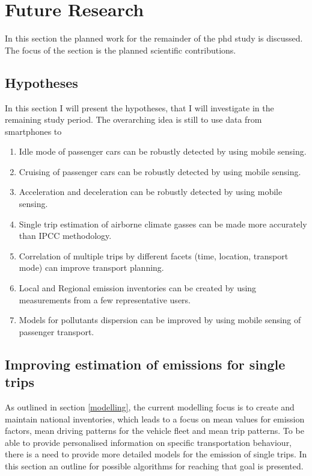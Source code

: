 \section{Future Research}\label{futurework}
In this section the planned work for the remainder of the phd study is discussed. The focus of the section is the planned scientific contributions.

\subsection{Hypotheses}
In this section I will present the hypotheses, that I will investigate in the remaining study period. The overarching idea is still to use data from smartphones to 
\begin{enumerate}
	\item{Idle mode of passenger cars can be robustly detected by using mobile sensing.}
	\item{Cruising of passenger cars can be robustly detected by using mobile sensing.}
	\item{Acceleration and deceleration can be robustly detected by using mobile sensing.}
	\item{Single trip estimation of airborne climate gasses can be made more accurately than IPCC methodology.}
	\item{Correlation of multiple trips by different facets (time, location, transport mode) can improve transport planning.}
	\item{Local and Regional emission inventories can be created by using measurements from a few representative users.}
	\item{Models for pollutants dispersion can be improved by using mobile sensing of passenger transport.}
\end{enumerate}
\subsection{Improving estimation of emissions for single trips}
As outlined in section \ref{modelling}, the current modelling focus is to create and maintain national inventories, which leads to a focus on mean values for emission factors, mean driving patterns for the vehicle fleet and mean trip patterns. To be able to provide personalised information on specific transportation behaviour, there is a need to provide more detailed models for the emission of single trips. In this section an outline for possible algorithms for reaching that goal is presented.

